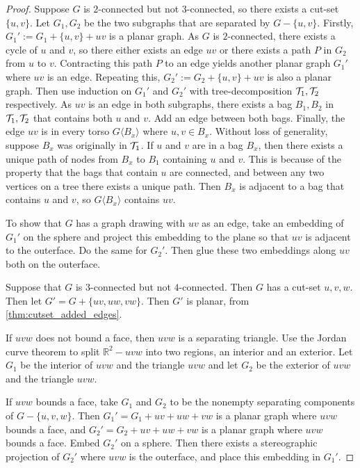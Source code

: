 \begin{proof}
	Suppose $G$ is $2$-connected but not $3$-connected, so there exists a cut-set $\{u,v\}$. Let $G_1, G_2$ be the two subgraphs that are separated by $G - \{u, v\}$. Firstly, $G_1' := G_1 + \{u,v\} + uv$ is a planar graph. As $G$ is $2$-connected, there exists a cycle of $u$ and $v$, so there either exists an edge $uv$ or there exists a path $P$ in $G_2$ from $u$ to $v$. Contracting this path $P$ to an edge yields another planar graph $G_1'$ where $uv$ is an edge. Repeating this, $G_2' := G_2 + \{u,v\} + uv$ is also a planar graph. Then use induction on $G_1'$ and $G_2'$ with tree-decomposition $\mathcal{T}_1, \mathcal{T}_2$ respectively. As $uv$ is an edge in both subgraphs, there exists a bag $B_1, B_2$ in $\mathcal{T}_1, \mathcal{T}_2$ that contains both $u$ and $v$. Add an edge between both bags. Finally, the edge $uv$ is in every torso $G\langle B_x \rangle$ where $u, v \in B_x$. Without loss of generality, suppose $B_x$ was originally in $\mathcal{T}_1$. If $u$ and $v$ are in a bag $B_x$, then there exists a unique path of nodes from $B_x$ to $B_1$ containing $u$ and $v$. This is because of the property that the bags that contain $u$ are connected, and between any two vertices on a tree there exists a unique path. Then $B_x$ is adjacent to a bag that contains $u$ and $v$, so $G \langle B_x \rangle$ contains $uv$. 

	To show that $G$ has a graph drawing with $uv$ as an edge, take an embedding of $G_1'$ on the sphere and project this embedding to the plane so that $uv$ is adjacent to the outerface. Do the same for $G_2'$. Then glue these two embeddings along $uv$ both on the outerface. 

	Suppose that $G$ is $3$-connected but not $4$-connected. Then $G$ has a cut-set $u,v,w$. Then let $G' = G + \{uv, uw, vw\}$. Then $G'$ is planar, from \cref{thm:cutset_added_edges}. 
	
	If $uvw$ does not bound a face, then $uvw$ is a separating triangle. Use the Jordan curve theorem to split $\mathbb{R}^2 - uvw$ into two regions, an interior and an exterior. Let $G_1$ be the interior of $uvw$ and the triangle $uvw$ and let $G_2$ be the exterior of $uvw$ and the triangle $uvw$. 

	If $uvw$ bounds a face, take $G_1$ and $G_2$ to be the nonempty separating components of $G - \{u,v,w\}$. Then $G_1' = G_1 + uv + uw + vw$ is a planar graph where $uvw$ bounds a face, and $G_2' = G_2 + uv + uw + vw$ is a planar graph where $uvw$ bounds a face. Embed $G_2'$ on a sphere. Then there exists a stereographic projection of $G_2'$ where $uvw$ is the outerface, and place this embedding in $G_1'$. 


\end{proof}
